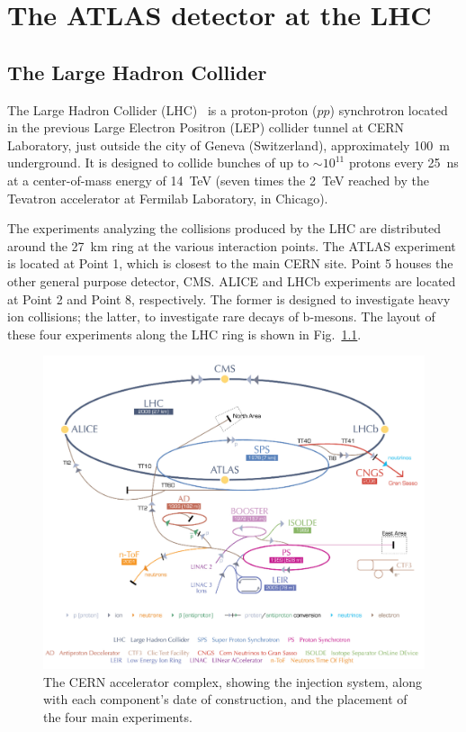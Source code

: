 %
%
\chapter{The ATLAS detector at the LHC}

\section{The Large Hadron Collider}


The Large Hadron Collider  (LHC)~\cite{Breskin:1244506} is a proton-proton ($pp$) synchrotron located in the previous Large Electron Positron (LEP) collider tunnel at CERN Laboratory, just outside the city of Geneva (Switzerland), approximately 100~m underground. It is designed to collide bunches of up to $\sim 10^{11}$ protons every 25~ns at a center-of-mass energy of 14~TeV (seven times the 2~TeV reached by the Tevatron accelerator at Fermilab Laboratory, in Chicago). 

The experiments analyzing the collisions produced by the LHC are distributed around the 27~km ring at the various interaction points. The ATLAS experiment is located at Point 1, which is closest to the main CERN site. Point 5 houses the other general purpose detector, CMS. ALICE and LHCb experiments are located at Point 2 and Point 8, respectively. The former is designed to investigate heavy ion collisions; the latter, to investigate rare decays of b-mesons. The layout of these four experiments along the LHC ring is shown in Fig.~\ref{fig:LHC1}.

\begin{figure}[htbp]
  \begin{center}
      \includegraphics[width=1\textwidth]{Fig2/CERNacceleratorcomplexCut.pdf}
    \caption{The CERN accelerator complex, showing the injection system, along with each component’s date of construction, and the placement of the four main experiments.}
    \label{fig:LHC1}
  \end{center}
\end{figure}


